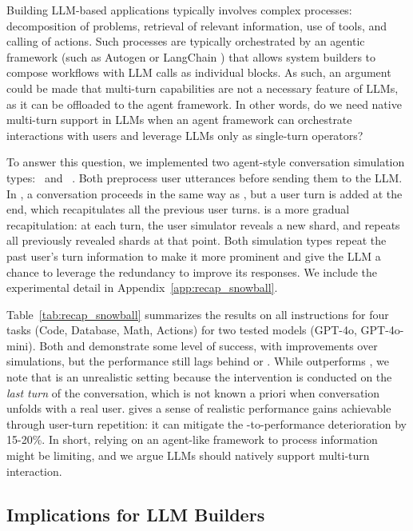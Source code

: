 \documentclass{article}
\begin{document}


Building LLM-based applications typically involves complex processes: decomposition of problems, retrieval of relevant information, use of tools, and calling of actions. Such processes are typically orchestrated by an agentic framework (such as Autogen \cite{wu2023autogen} or LangChain \cite{chase2022langchain}) that allows system builders to compose workflows with LLM calls as individual blocks. As such, an argument could be made that multi-turn capabilities are not a necessary feature of LLMs, as it can be offloaded to the agent framework. In other words, do we need native multi-turn support in LLMs when an agent framework can orchestrate interactions with users and leverage LLMs only as single-turn operators?

To answer this question, we implemented two agent-style conversation simulation types: \recap~\recapt and \snowball~\snowballt. Both preprocess user utterances before sending them to the LLM. In \recapt, a conversation proceeds in the same way as \shardedt, but a user turn is added at the end, which recapitulates all the previous user turns. \snowballt is a more gradual recapitulation: at each turn, the user simulator reveals a new shard, and repeats all previously revealed shards at that point. Both simulation types repeat the past user's turn information to make it more prominent and give the LLM a chance to leverage the redundancy to improve its responses. We include the experimental detail in Appendix~\ref{app:recap_snowball}.

Table~\ref{tab:recap_snowball} summarizes the results on all instructions for four tasks (Code, Database, Math, Actions) for two tested models (GPT-4o, GPT-4o-mini). Both \recapt and \snowballt demonstrate some level of success, with improvements over \shardedt simulations, but the performance still lags behind \fullt or \concatt. While \recapt outperforms \snowballt, we note that \recapt is an unrealistic setting because the intervention is conducted on the \textit{last turn} of the conversation, which is not known a priori when conversation unfolds with a real user. \snowballt gives a sense of realistic performance gains achievable through user-turn repetition: it can mitigate the \fullt-to-\shardedt performance deterioration by 15-20\%. In short, relying on an agent-like framework to process information might be limiting, and we argue LLMs should natively support multi-turn interaction.

\subsection{Implications for LLM Builders} \label{sec:implications_llms}
\end{document}
